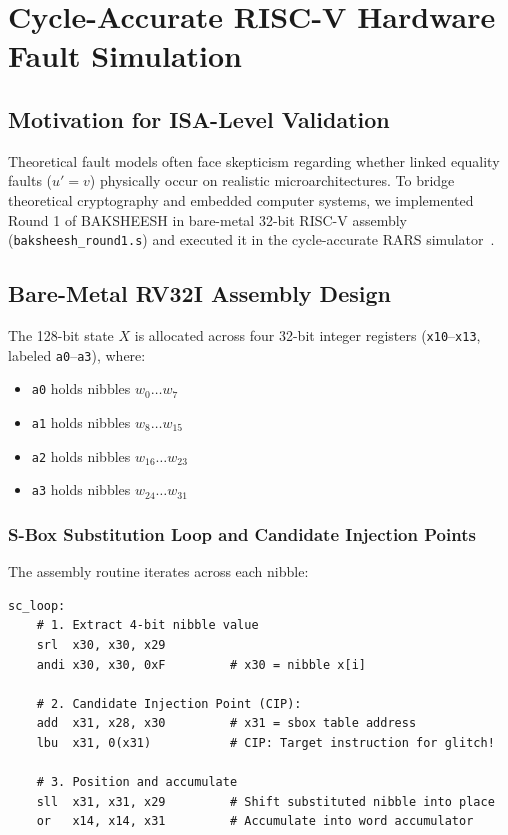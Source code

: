 \documentclass[12pt,a4paper,oneside]{report}
\begin{document}
\chapter{Cycle-Accurate RISC-V Hardware Fault Simulation}
\label{ch:riscv}

\section{Motivation for ISA-Level Validation}
\label{sec:riscv_motivation}
Theoretical fault models often face skepticism regarding whether linked equality faults ($u' = v$) physically occur on realistic microarchitectures. To bridge theoretical cryptography and embedded computer systems, we implemented Round 1 of BAKSHEESH in bare-metal 32-bit RISC-V assembly (\texttt{baksheesh\_round1.s}) and executed it in the cycle-accurate RARS simulator~\cite{rars_simulator}.

\section{Bare-Metal RV32I Assembly Design}
\label{sec:rv32i_design}
The 128-bit state $X$ is allocated across four 32-bit integer registers (\texttt{x10}--\texttt{x13}, labeled \texttt{a0}--\texttt{a3}), where:
\begin{itemize}
    \item \texttt{a0} holds nibbles $w_0 \dots w_7$
    \item \texttt{a1} holds nibbles $w_8 \dots w_{15}$
    \item \texttt{a2} holds nibbles $w_{16} \dots w_{23}$
    \item \texttt{a3} holds nibbles $w_{24} \dots w_{31}$
\end{itemize}

\subsection{S-Box Substitution Loop and Candidate Injection Points}
The assembly routine iterates across each nibble:
\begin{lstlisting}[language={[RISC-V]Assembler}, caption={RV32I S-Box Substitution Loop and Candidate Injection Point (CIP).}]
sc_loop:
    # 1. Extract 4-bit nibble value
    srl  x30, x30, x29
    andi x30, x30, 0xF         # x30 = nibble x[i]
    
    # 2. Candidate Injection Point (CIP):
    add  x31, x28, x30         # x31 = sbox table address
    lbu  x31, 0(x31)           # CIP: Target instruction for glitch!
    
    # 3. Position and accumulate
    sll  x31, x31, x29         # Shift substituted nibble into place
    or   x14, x14, x31         # Accumulate into word accumulator
\end{lstlisting}
\end{document}
